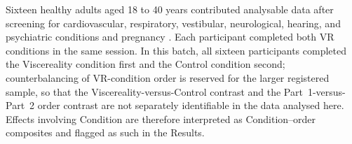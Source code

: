 Sixteen healthy adults aged 18 to 40 years contributed analysable data after screening for cardiovascular, respiratory, vestibular, neurological, hearing, and psychiatric conditions and pregnancy \citep{pfeiffer2018vestibular, Ardizzi2018}. Each participant completed both VR conditions in the same session. In this batch, all sixteen participants completed the Viscereality condition first and the Control condition second; counterbalancing of VR-condition order is reserved for the larger registered sample, so that the Viscereality-versus-Control contrast and the Part~1-versus-Part~2 order contrast are not separately identifiable in the data analysed here. Effects involving Condition are therefore interpreted as Condition--order composites and flagged as such in the Results.
